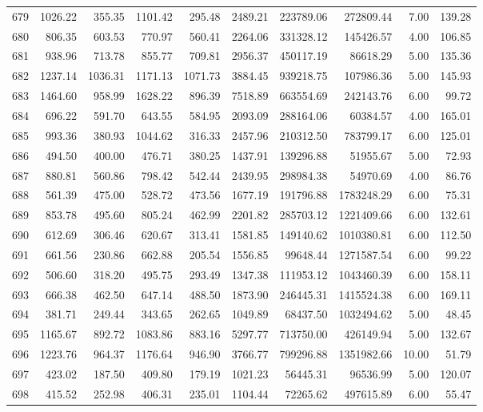 \begin{tabular}{lrrrrrrrrr}
679 & 1026.22 & 355.35 & 1101.42 & 295.48 & 2489.21 & 223789.06 & 272809.44 & 7.00 & 139.28 \\
680 & 806.35 & 603.53 & 770.97 & 560.41 & 2264.06 & 331328.12 & 145426.57 & 4.00 & 106.85 \\
681 & 938.96 & 713.78 & 855.77 & 709.81 & 2956.37 & 450117.19 & 86618.29 & 5.00 & 135.36 \\
682 & 1237.14 & 1036.31 & 1171.13 & 1071.73 & 3884.45 & 939218.75 & 107986.36 & 5.00 & 145.93 \\
683 & 1464.60 & 958.99 & 1628.22 & 896.39 & 7518.89 & 663554.69 & 242143.76 & 6.00 & 99.72 \\
684 & 696.22 & 591.70 & 643.55 & 584.95 & 2093.09 & 288164.06 & 60384.57 & 4.00 & 165.01 \\
685 & 993.36 & 380.93 & 1044.62 & 316.33 & 2457.96 & 210312.50 & 783799.17 & 6.00 & 125.01 \\
686 & 494.50 & 400.00 & 476.71 & 380.25 & 1437.91 & 139296.88 & 51955.67 & 5.00 & 72.93 \\
687 & 880.81 & 560.86 & 798.42 & 542.44 & 2439.95 & 298984.38 & 54970.69 & 4.00 & 86.76 \\
688 & 561.39 & 475.00 & 528.72 & 473.56 & 1677.19 & 191796.88 & 1783248.29 & 6.00 & 75.31 \\
689 & 853.78 & 495.60 & 805.24 & 462.99 & 2201.82 & 285703.12 & 1221409.66 & 6.00 & 132.61 \\
690 & 612.69 & 306.46 & 620.67 & 313.41 & 1581.85 & 149140.62 & 1010380.81 & 6.00 & 112.50 \\
691 & 661.56 & 230.86 & 662.88 & 205.54 & 1556.85 & 99648.44 & 1271587.54 & 6.00 & 99.22 \\
692 & 506.60 & 318.20 & 495.75 & 293.49 & 1347.38 & 111953.12 & 1043460.39 & 6.00 & 158.11 \\
693 & 666.38 & 462.50 & 647.14 & 488.50 & 1873.90 & 246445.31 & 1415524.38 & 6.00 & 169.11 \\
694 & 381.71 & 249.44 & 343.65 & 262.65 & 1049.89 & 68437.50 & 1032494.62 & 5.00 & 48.45 \\
695 & 1165.67 & 892.72 & 1083.86 & 883.16 & 5297.77 & 713750.00 & 426149.94 & 5.00 & 132.67 \\
696 & 1223.76 & 964.37 & 1176.64 & 946.90 & 3766.77 & 799296.88 & 1351982.66 & 10.00 & 51.79 \\
697 & 423.02 & 187.50 & 409.80 & 179.19 & 1021.23 & 56445.31 & 96536.99 & 5.00 & 120.07 \\
698 & 415.52 & 252.98 & 406.31 & 235.01 & 1104.44 & 72265.62 & 497615.89 & 6.00 & 55.47 \\

\end{tabular}
